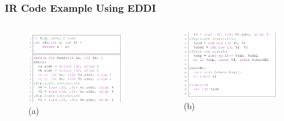 \documentclass[
	12pt, %
]{beamer}
\begin{document}
\begin{frame}
	\frametitle{IR Code Example Using EDDI}
	
	
	\begin{columns}[c]
		\begin{column}{0.5\textwidth} %
			\begin{figure}
				\includegraphics[width=1\linewidth]{img2.png}
				\caption{(a)}
				\label{IR code examples of using EDDI(a)}
			\end{figure}
		\end{column}
		\begin{column}{0.5\textwidth} %
			\begin{figure}
				\includegraphics[width=1\linewidth]{img3.png}
				\caption{(b)}
				\label{IR code examples of using EDDs(b)}
			\end{figure}
		\end{column}
		\end{columns}
\end{frame}
\end{document}
